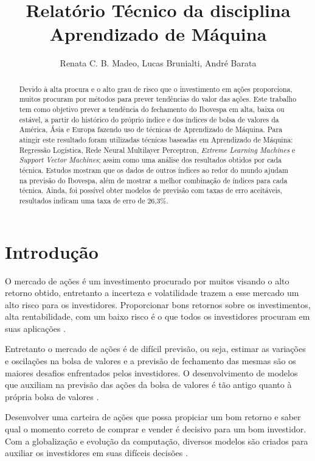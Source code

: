 \documentclass[12pt,a4paper,utf8]{ppgsi}
\title{Relatório Técnico da disciplina Aprendizado de Máquina}
\author{Renata C. B. Madeo\inst{1}, Lucas Brunialti\inst{1}, André Barata\inst{1}}
\begin{document}
\maketitle

\begin{abstract}

Devido à alta procura e o alto grau de risco que o investimento em ações proporciona, muitos procuram por métodos para prever tendências do valor das ações. Este trabalho tem como objetivo prever a tendência do fechamento do Ibovespa em alta, baixa ou estável, a partir do histórico do próprio índice e dos índices de bolsa de valores da América, Ásia e Europa fazendo uso de técnicas de Aprendizado de Máquina. Para atingir este resultado foram utilizadas técnicas baseadas em Aprendizado de Máquina: Regressão Logística, Rede Neural Multilayer Perceptron, \textit{Extreme Learning Machines} e \textit{Support Vector Machines}; assim como uma análise dos resultados obtidos por cada técnica. Estudos mostram que os dados de outros índices ao redor do mundo ajudam na previsão do Ibovespa, além de mostrar a melhor combinação de índices para cada técnica. Ainda, foi possível obter modelos de previsão com taxas de erro aceitáveis, resultados indicam uma taxa de erro de 26,3\%.
\end{abstract}

\section{Introdução}

O mercado de ações é um investimento procurado por muitos visando o alto retorno obtido, entretanto a incerteza e volatilidade trazem a esse mercado um alto risco para os investidores. Proporcionar bons retornos sobre os investimentos, alta rentabilidade, com um baixo risco é o que todos os investidores procuram em suas aplicações \citep{rocha2007esticar}.

Entretanto o mercado de ações é de difícil previsão, ou seja, estimar as variações e oscilações na bolsa de valores e a previsão de fechamento das mesmas são os maiores desafios enfrentados pelos investidores. O desenvolvimento de modelos que auxiliam na previsão das ações da bolsa de valores é tão antigo quanto à própria bolsa de valores \citep{bueno2000analise}.

Desenvolver uma carteira de ações que possa propiciar um bom retorno e saber qual o momento correto de comprar e vender é decisivo para um bom investidor. Com a globalização e evolução da computação, diversos modelos são criados para auxiliar os investidores em suas difíceis decisões \citep{de2006uso}.
\end{document}
